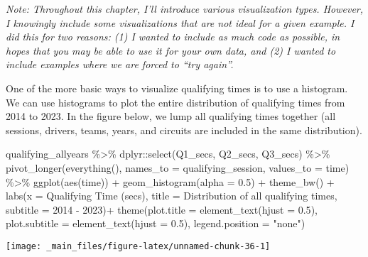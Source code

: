 \documentclass[
]{book}
\newenvironment{Shaded}{\begin{snugshade}}{\end{snugshade}}
\newcommand{\AttributeTok}[1]{\textcolor[rgb]{0.77,0.63,0.00}{#1}}
\newcommand{\FloatTok}[1]{\textcolor[rgb]{0.00,0.00,0.81}{#1}}
\newcommand{\FunctionTok}[1]{\textcolor[rgb]{0.00,0.00,0.00}{#1}}
\newcommand{\NormalTok}[1]{#1}
\newcommand{\SpecialCharTok}[1]{\textcolor[rgb]{0.00,0.00,0.00}{#1}}
\newcommand{\StringTok}[1]{\textcolor[rgb]{0.31,0.60,0.02}{#1}}
\begin{document}
\emph{Note: Throughout this chapter, I'll introduce various visualization types. However, I knowingly include some visualizations that are not ideal for a given example. I did this for two reasons: (1) I wanted to include as much code as possible, in hopes that you may be able to use it for your own data, and (2) I wanted to include examples where we are forced to ``try again''.}

One of the more basic ways to visualize qualifying times is to use a histogram. We can use histograms to plot the entire distribution of qualifying times from 2014 to 2023. In the figure below, we lump all qualifying times together (all sessions, drivers, teams, years, and circuits are included in the same distribution).

\begin{Shaded}
\begin{Highlighting}[]
\NormalTok{qualifying\_allyears }\SpecialCharTok{\%\textgreater{}\%}
\NormalTok{  dplyr}\SpecialCharTok{::}\FunctionTok{select}\NormalTok{(Q1\_secs, Q2\_secs, Q3\_secs) }\SpecialCharTok{\%\textgreater{}\%}
  \FunctionTok{pivot\_longer}\NormalTok{(}\FunctionTok{everything}\NormalTok{(), }\AttributeTok{names\_to =} \StringTok{\textquotesingle{}qualifying\_session\textquotesingle{}}\NormalTok{, }\AttributeTok{values\_to =} \StringTok{\textquotesingle{}time\textquotesingle{}}\NormalTok{) }\SpecialCharTok{\%\textgreater{}\%}
  \FunctionTok{ggplot}\NormalTok{(}\FunctionTok{aes}\NormalTok{(time)) }\SpecialCharTok{+}
  \FunctionTok{geom\_histogram}\NormalTok{(}\AttributeTok{alpha =} \FloatTok{0.5}\NormalTok{) }\SpecialCharTok{+}
  \FunctionTok{theme\_bw}\NormalTok{() }\SpecialCharTok{+}
  \FunctionTok{labs}\NormalTok{(}\AttributeTok{x =} \StringTok{\textquotesingle{}Qualifying Time (secs)\textquotesingle{}}\NormalTok{,}
       \AttributeTok{title =} \StringTok{\textquotesingle{}Distribution of all qualifying times\textquotesingle{}}\NormalTok{,}
       \AttributeTok{subtitle =} \StringTok{\textquotesingle{}2014 {-} 2023\textquotesingle{}}\NormalTok{)}\SpecialCharTok{+}
  \FunctionTok{theme}\NormalTok{(}\AttributeTok{plot.title =} \FunctionTok{element\_text}\NormalTok{(}\AttributeTok{hjust =} \FloatTok{0.5}\NormalTok{),}
        \AttributeTok{plot.subtitle =} \FunctionTok{element\_text}\NormalTok{(}\AttributeTok{hjust =} \FloatTok{0.5}\NormalTok{),}
        \AttributeTok{legend.position =} \StringTok{"none"}\NormalTok{)}
\end{Highlighting}
\end{Shaded}

\begin{center}\texttt{[image: \_main\_files/figure-latex/unnamed-chunk-36-1]} \end{center}
\end{document}
